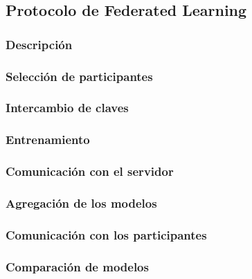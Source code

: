 \subsection{Protocolo de Federated Learning}


\subsubsection{Descripción}

\subsubsection{Selección de participantes}


\subsubsection{Intercambio de claves}


\subsubsection{Entrenamiento}


\subsubsection{Comunicación con el servidor}


\subsubsection{Agregación de los modelos}


\subsubsection{Comunicación con los participantes}

\subsubsection{Comparación de modelos}
